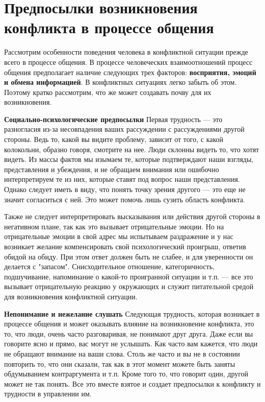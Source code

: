 \documentclass[a4paper,14pt]{extarticle}
\begin{document}
\pagebreak
\section{Предпосылки возникновения конфликта в процессе общения}

Рассмотрим особенности поведения человека в конфликтной ситуации прежде всего в процессе общения. В процессе человеческих взаимоотношений процесс общения предполагает наличие следующих трех факторов: \textbf{восприятия, эмоций и обмена информацией}. В конфликтных ситуациях легко забыть об этом. Поэтому кратко рассмотрим, что же может создавать почву для их возникновения.

\textbf{Социально-психологические предпосылки} Первая трудность — это разногласия из-за несовпадения ваших рассуждении с рассуждениями другой стороны. Ведь то, какой вы видите проблему, зависит от того, с какой колокольни, образно говоря, смотрите на нее. Люди склонны видеть то, что хотят видеть. Из массы фактов мы изымаем те, которые подтверждают наши взгляды, представления и убеждения, и не обращаем внимания или ошибочно интерпретируем те из них, которые ставят под вопрос наши представления. Однако следует иметь в виду, что понять точку зрения другого — это еще не значит согласиться с ней. Это может помочь лишь сузить область конфликта.

Также не следует интерпретировать высказывания или действия другой стороны в негативном плане, так как это вызывает отрицательные эмоции. Но на отрицательные эмоции в свой адрес мы испытываем раздражение и у нас возникает желание компенсировать свой психологический проигрыш, ответив обидой на обиду. При этом ответ должен быть не слабее, и для уверенности он делается с "запасом". Снисходительное отношение, категоричность, подшучивание, напоминание о какой-то проигранной ситуации и т.п. — все это вызывает отрицательную реакцию у окружающих и служит питательной средой для возникновения конфликтной ситуации.

\textbf{Непонимание и нежелание слушать} Следующая трудность, которая возникает в процессе общения и может оказывать влияние на возникновение конфликта, это то, что люди, очень часто разговаривая, не понимают друг друга. Даже если вы говорите ясно и прямо, вас могут не услышать. Как часто вам кажется, что люди не обращают внимание на ваши слова. Столь же часто и вы не в состоянии повторить то, что они сказали, так как в этот момент можете быть заняты обдумыванием контраргумента и т.п. Кроме того то, что говорит один, другой может не так понять. Все это вместе взятое и создает предпосылки к конфликту и трудности в управлении им.
\end{document}
